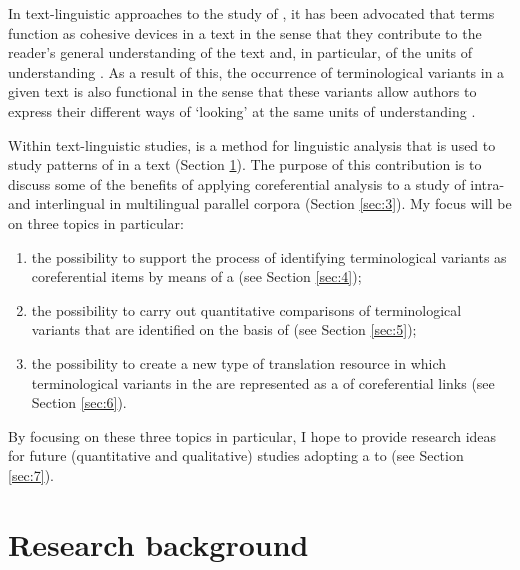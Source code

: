 \documentclass[output=paper]{langsci/langscibook.cls}
\begin{document}
In text-linguistic approaches to the study of  \citep{Collet2004}, it has 
been advocated that terms function as cohesive devices in a text in the sense that 
they contribute to the reader's general understanding of the text and, in particular, 
of the units of understanding \citep{Temmerman2000}. As a result of this, the occurrence 
of terminological variants in a given text is also functional in the sense that 
these variants allow authors to express their different ways of `looking' at the 
same units of understanding \citep{Cabre2008,FreixaEtAl2008,FernandezSilva2010}. 

Within text-linguistic studies,  is a method for linguistic 
analysis that is used to study patterns of  in a text (Section \ref{sec:2}). The 
purpose of this contribution is to discuss some of the benefits of applying coreferential 
analysis to a study of intra- and interlingual  in multilingual 
parallel corpora (Section \ref{sec:3}). My focus will be on three topics in particular: 

\begin{enumerate}
\item  the possibility to support the process of identifying terminological variants 
as coreferential items by means of a  (see Section \ref{sec:4}); 

\item the possibility to carry out quantitative comparisons of terminological variants 
that are identified on the basis of  (see Section \ref{sec:5});

\item the possibility to create a new type of translation resource in which terminological 
variants in the  are represented as a  of coreferential links 
(see Section \ref{sec:6}).
\end{enumerate}

By focusing on these three topics in particular, I hope to provide research ideas 
for future (quantitative and qualitative) studies adopting a  
to  (see Section \ref{sec:7}).\label{HRef445070813}

\section{Research background}\label{sec:2}
\end{document}

